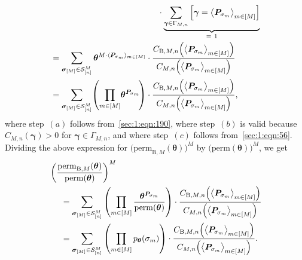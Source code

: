 \documentclass[journal,lettersize,twocolumn]{IEEEtran} %
\newcommand{\vect}[1]{ \bm{#1} }
\newcommand{\set}[1]{\mathcal{#1}}
\newcommand{\vgam}{ \vect{\gamma} }
\newcommand{\matr}[1]{ \bm{#1} }
\newcommand{\perm}{ \mathrm{perm} }
\newcommand{\permbM}[1]{\perm_{ \mathrm{B}, #1 }}
\newcommand{\pmtheta}{p_{\mtheta}}
\newcommand{\vsigma}{ \bm{\sigma} }
\newcommand{\setS}{\set{S}}
\newcommand{\CM}[1]{\Cgen{M}{#1}}
\newcommand{\Cgen}[2]{C_{#1,#2}}
\newcommand{\CBM}[1]{\CBgen{M}{#1}}
\newcommand{\CBgen}[2]{C_{\mathrm{B},#1,#2}}
\newcommand{\mtheta}{\matr{\theta}}
\newcommand{\mP}{\matr{P}}
\newcommand{\GamMn}{ \Gamma_{M,n} }
\begin{document}
\begin{appendices}
\begin{align*}
    &\hspace{4.5cm}
         \cdot
         \underbrace
         {
           \sum\limits_{ \vgam \in \GamMn } 
           \left[ 
             \vgam = \bigl\langle \mP_{\sigma_{m}} \bigr\rangle_{m \in [M]}
           \right]
         }_{= \ 1} \\
    &= \sum_{ \vsigma_{[M]} \in \setS_{[n]}^{M} }
         \mtheta^{ M \cdot \langle \mP_{\sigma_{m}} \rangle_{m \in [M]}}
         \cdot
         \frac{\CBM{n}\Bigl(
                        \bigl\langle \mP_{\sigma_{m}} \bigr\rangle_{m \in [M]}
                      \Bigr)}
              {\CM{n}\Bigl(
                        \bigl\langle \mP_{\sigma_{m}} \bigr\rangle_{m \in [M]}
                      \Bigr)} \\
    &= \sum_{ \vsigma_{[M]} \in \setS_{[n]}^{M} } \!
         \left(
           \prod_{m \in [M]} \!
             \mtheta^{ \mP_{\sigma_{m}} } \!
         \right)
         \cdot
         \frac{\CBM{n}\Bigl(
                        \bigl\langle \mP_{\sigma_{m}} \bigr\rangle_{m \in [M]}
                      \Bigr)}
              {\CM{n}\Bigl(
                       \bigl\langle \mP_{\sigma_{m}} \bigr\rangle_{m \in [M]}
                     \Bigr)},
\end{align*}
where step~$(a)$ follows from~\eqref{sec:1:eqn:190}, where step~$(b)$ is valid
because $\CM{n}(\vgam) > 0$ for $\vgam \in \GamMn$, and where step~$(c)$
follows from~\eqref{sec:1:eqn:56}. Dividing the above expression for
$\bigl( \permbM{M}(\mtheta) \bigr)^M$ by $\bigl( \perm(\mtheta) \bigr)^M$, we
get
\begin{align*}
  \hspace{0.5cm}&\hspace{-0.5cm}
  \left( 
    \frac{\permbM{M}(\mtheta)}
         {\perm(\mtheta)}
  \right)^M \\
    &= \sum_{ \vsigma_{[M]} \in \setS_{[n]}^{M} }
         \left(
           \prod_{m \in [M]}
             \frac{\mtheta^{ \mP_{\sigma_{m}} }}
                  {\perm(\mtheta)}
         \right)
         \cdot
         \frac{\CBM{n}\Bigl(
                        \bigl\langle \mP_{\sigma_{m}} \bigr\rangle_{m \in [M]}
                      \Bigr)}
              {\CM{n}\Bigl(
                        \bigl\langle \mP_{\sigma_{m}} \bigr\rangle_{m \in [M]}
                      \Bigr)} \\
    &= \sum_{ \vsigma_{[M]} \in \setS_{[n]}^{M} }
         \left(
           \prod_{m \in [M]}
             \pmtheta(\sigma_m)
         \right)
         \cdot
         \frac{\CBM{n}\Bigl(
                        \bigl\langle \mP_{\sigma_{m}} \bigr\rangle_{m \in [M]}
                      \Bigr)}
              {\CM{n}\Bigl(
                        \bigl\langle \mP_{\sigma_{m}} \bigr\rangle_{m \in [M]}
                      \Bigr)}.
\end{align*}


\end{appendices}
\end{document}
